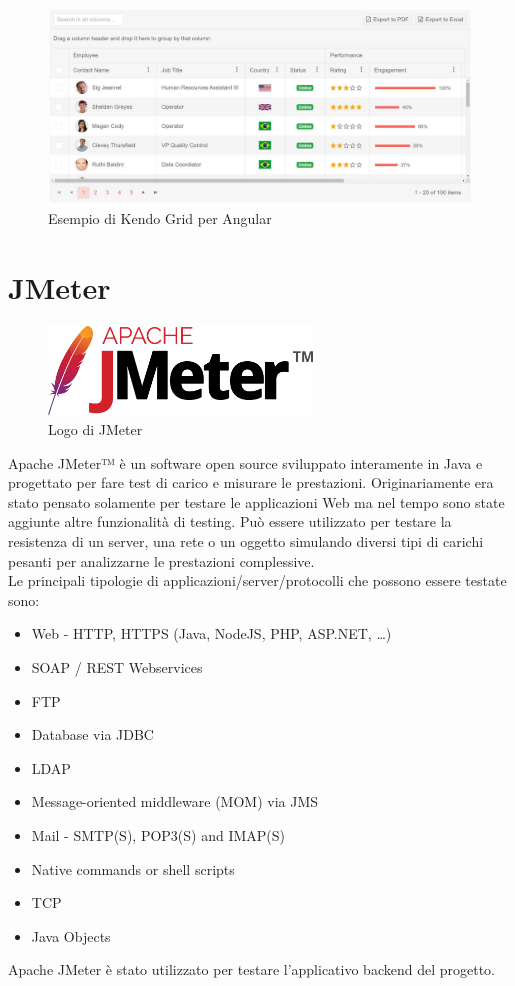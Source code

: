 \begin{figure}[h]
\begin{center}
  \includegraphics[width=14cm]{images/kendo_grid.JPG}
  \caption{Esempio di Kendo Grid per Angular}\label{fig:git}
\end{center}
\end{figure}
\FloatBarrier

\section{JMeter}
\begin{figure}[h]
\begin{center}
  \includegraphics[width=7cm]{images/jmeter_logo.png}
  \caption{Logo di JMeter}\label{fig:git}
\end{center}
\end{figure}
\FloatBarrier
Apache JMeter™ è un software open source sviluppato interamente in Java e progettato per fare test di carico e misurare le prestazioni. Originariamente era stato pensato solamente per testare le applicazioni Web ma nel tempo sono state aggiunte altre funzionalità di testing. 
Può essere utilizzato per testare la resistenza di un server, una rete o un oggetto simulando diversi tipi di carichi pesanti per analizzarne le prestazioni complessive. \\
Le principali tipologie di applicazioni/server/protocolli che possono essere testate sono:
\begin{itemize}
    \item Web - HTTP, HTTPS (Java, NodeJS, PHP, ASP.NET, …)
    \item SOAP / REST Webservices
    \item FTP
    \item Database via JDBC
    \item LDAP
    \item Message-oriented middleware (MOM) via JMS
    \item Mail - SMTP(S), POP3(S) and IMAP(S)
    \item Native commands or shell scripts
    \item TCP
    \item Java Objects
\end{itemize}
\cite{JMETER} 
Apache JMeter è stato utilizzato per testare l'applicativo backend del progetto.